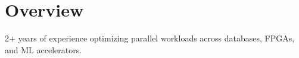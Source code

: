 \documentclass{moderncv}
\begin{document}
\makecvtitle
\begin{comment}
\section{Skills}
\begin{minipage}{0.25\textwidth}
    \begin{itemize}
        \item Java
        \item C++
        \item Python
        \item Scala
    \end{itemize}
\end{minipage}
\begin{minipage}{0.25\textwidth}
    \begin{itemize}
        \item LLVM
        \item MLIR
        \item SYCL
        \item SQL
    \end{itemizes}
\end{minipage}
\begin{minipage}{0.25\textwidth}
    \begin{itemize}
        \item PyTorch
        \item ONNX
        \item Protobuf
        \item Verilog
    \end{itemize}
\end{minipage}
\begin{minipage}{0.25\textwidth}
    \begin{itemize}
        \item Compiler Design
        \item Parallel Execution
        \item FPGA Development
        \item ML Acceleration
    \end{itemize}
\end{minipage}
\end{comment}
\section{Overview}
\begin{center}
2+ years of experience optimizing parallel workloads across databases, FPGAs, and ML accelerators.
\end{center}
\end{document}
